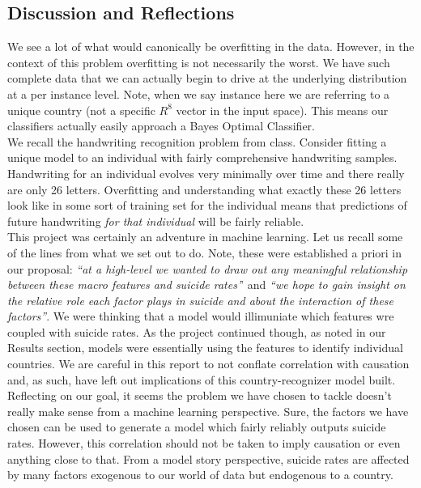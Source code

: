 \documentclass{article}
\begin{document}
\begin{multicols}{2}
\section{Discussion and Reflections}

We see a lot of what would canonically be overfitting in the data. However, in the context of this problem overfitting is not necessarily the worst. We have such complete data that we can actually begin to drive at the underlying distribution at a per instance level. Note, when we say instance here we are referring to a unique country (not a specific $R^8$ vector in the input space). This means our classifiers actually easily approach a Bayes Optimal Classifier. \\
We recall the handwriting recognition problem from class. Consider fitting a unique model to an individual with fairly comprehensive handwriting samples. Handwriting for an individual evolves very minimally over time and there really are only 26 letters. Overfitting and understanding what exactly these 26 letters look like in some sort of training set for the individual means that predictions of future handwriting \textit{for that individual} will be fairly reliable. \\
This project was certainly an adventure in machine learning. Let us recall some of the lines from what we set out to do. Note, these were established a priori in our proposal: \textit{``at a high-level we wanted to draw out any meaningful relationship between these macro features and suicide rates'}' and \textit{``we hope to gain insight on the
relative role each factor plays in suicide and about the interaction of these factors''}. We were thinking that a model would illimuniate which features wre coupled with suicide rates. As the project continued though, as noted in our Results section, models were essentially using the features to identify individual countries. We are careful in this report to not conflate correlation with causation and, as such, have left out implications of this country-recognizer model built. \\
Reflecting on our goal, it seems the problem we have chosen to tackle doesn't really make sense from a machine learning perspective. Sure, the factors we have chosen can be used to generate a model which fairly reliably outputs suicide rates. However, this correlation should not be taken to imply causation or even anything close to that. From a model story perspective, suicide rates are affected by many factors exogenous to our world of data but endogenous to a country. \\

\end{multicols}
\end{document}
